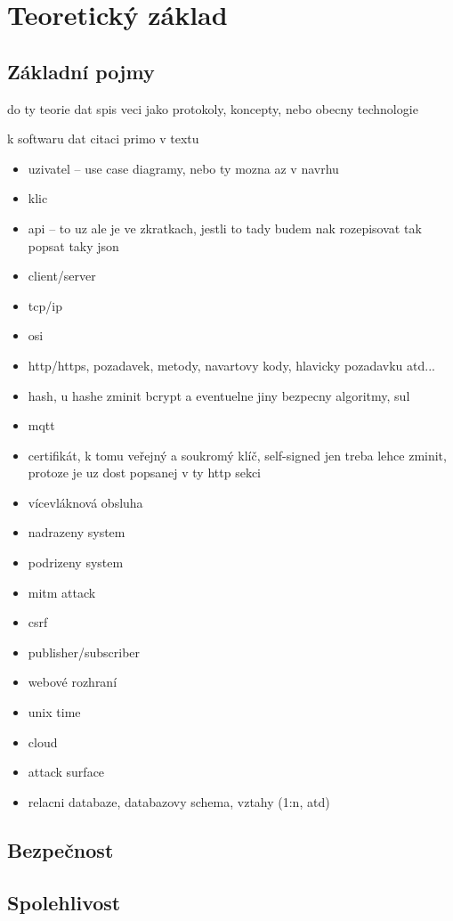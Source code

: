 \chapter{Teoretický základ}
\label{sec:te}

\section{Základní pojmy}

do ty teorie dat spis veci jako protokoly, koncepty, nebo obecny technologie

k softwaru dat citaci primo v textu

\begin{itemize}
    \item uzivatel -- use case diagramy, nebo ty mozna az v navrhu
    \item klic
    \item api -- to uz ale je ve zkratkach, jestli to tady budem nak rozepisovat tak popsat taky json
    \item client/server
    \item tcp/ip
    \item osi
    \item http/https, pozadavek, metody, navartovy kody, hlavicky pozadavku atd...
    \item hash, u hashe zminit bcrypt a eventuelne jiny bezpecny algoritmy, sul
    \item mqtt
    \item certifikát, k tomu veřejný a soukromý klíč, self-signed jen treba lehce zminit, protoze je uz dost popsanej v ty http sekci
    \item vícevláknová obsluha
    \item nadrazeny system
    \item podrizeny system
    \item mitm attack
    \item csrf
    \item publisher/subscriber
    \item webové rozhraní
    \item unix time
    \item cloud
    \item attack surface
    \item relacni databaze, databazovy schema, vztahy (1:n, atd)
\end{itemize}

\section{Bezpečnost}

\section{Spolehlivost}